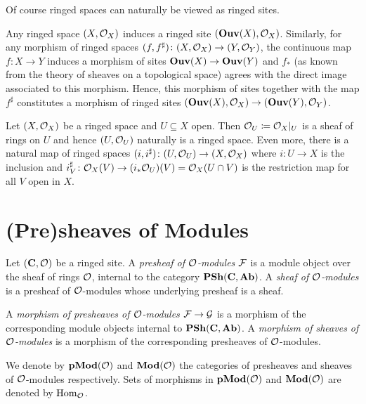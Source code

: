 Of course ringed spaces can naturally be viewed as ringed sites.
\begin{remark}
	Any ringed space $(X,{{\mathcal{O}}_{X}})$ induces a ringed site $({{\mathbf{Ouv}}(X)}, {{\mathcal{O}}_{X}})$. Similarly, for any morphism of ringed spaces $(f,f^\sharp)\colon (X,{{\mathcal{O}}_{X}})\to(Y,{{\mathcal{O}}_{Y}})$, the continuous map $f\colon X\to Y$ induces a morphism of sites ${{\mathbf{Ouv}}(X)}\to{{\mathbf{Ouv}}(Y)}$ and $f_\ast$ (as known from the theory of sheaves on a topological space) agrees with the direct image associated to this morphism. Hence, this morphism of sites together with the map $f^\sharp$ constitutes a morphism of ringed sites $({{\mathbf{Ouv}}(X)}, {{\mathcal{O}}_{X}}) \to ({{\mathbf{Ouv}}(Y)}, {{\mathcal{O}}_{Y}})$.
\end{remark}

\begin{remark}
	Let $(X,{{\mathcal{O}}_{X}})$ be a ringed space and $U\subseteq X$ open. Then ${{\mathcal{O}}_{U}}\coloneqq {{\mathcal{O}}_{X}}\vert_U$ is a sheaf of rings on $U$ and hence $(U, {{\mathcal{O}}_{U}})$ naturally is a ringed space. Even more, there is a natural map of ringed spaces $(i,i^\sharp)\colon (U, {{\mathcal{O}}_{U}})\to (X, {{\mathcal{O}}_{X}})$ where $i\colon U\to X$ is the inclusion and $i^\sharp_V \colon {{\mathcal{O}}_{X}}(V)\to (i_\ast{{\mathcal{O}}_{U}})(V) = {{\mathcal{O}}_{X}}(U\cap V)$ is the restriction map for all $V$ open in $X$.
\end{remark}


\section{(Pre)sheaves of Modules}
\label{section: (pre)sheaves of modules}

\begin{definition}
	\label{definition: (pre)sheaves of modules}
	
	Let $({{\mathbf{C}}}, {\mathcal{O}})$ be a ringed site. A \emph{presheaf of ${\mathcal{O}}$-modules} ${\mathcal{F}}$ is a module object over the sheaf of rings ${\mathcal{O}}$, internal to the category $\Presheaves{\site C}{\Ab}$. A \emph{sheaf of ${\mathcal{O}}$-modules} is a presheaf of ${\mathcal{O}}$-modules whose underlying presheaf is a sheaf.
	
	A \emph{morphism of presheaves of ${\mathcal{O}}$-modules} ${\mathcal{F}}\to{\mathcal{G}}$ is a morphism of the corresponding module objects internal to $\Presheaves{\site C}{\Ab}$. A \emph{morphism of sheaves of ${\mathcal{O}}$-modules} is a morphism of the corresponding presheaves of ${\mathcal{O}}$-modules.
	
	We denote by ${{\mathbf{pMod}}({\mathcal{O}})}$ and ${{\mathbf{Mod}}({\mathcal{O}})}$ the categories of presheaves and sheaves of ${\mathcal{O}}$-modules respectively. Sets of morphisms in ${{\mathbf{pMod}}({\mathcal{O}})}$ and ${{\mathbf{Mod}}({\mathcal{O}})}$ are denoted by ${\operatorname{Hom}}_{\mathcal{O}}$.
\end{definition}

